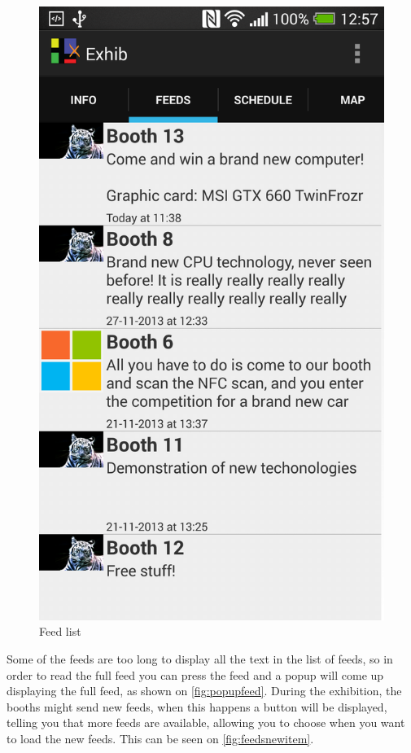 \begin{figure}[H]
\begin{minipage}[b]{0.5\columnwidth}
\includegraphics[width=\columnwidth]{img/finaldesign/feedsscreen.png}
\caption{Feed list} 
\label{fig:feedsscreen}
\end{minipage}
\end{figure}

Some of the feeds are too long to display all the text in the list of feeds, so in order to read the full feed you can press the feed and a popup will come up displaying the full feed, as shown on \autoref{fig:popupfeed}. During the exhibition,  the booths might send new feeds, when this happens a button will be displayed, telling you that more feeds are available, allowing you to choose when you want to load the new feeds. This can be seen on \autoref{fig:feedsnewitem}.

